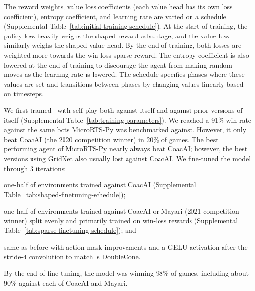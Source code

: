 \documentclass[conference]{IEEEtran}
\begin{document}
The reward weights, value loss coefficients (each value
head has its own loss coefficient), entropy coefficient, and learning rate are varied on
a schedule (Supplemental Table~\ref{tab:initial-training-schedule}). At the start of training, the policy loss heavily weighs the shaped 
reward advantage, and the value loss similarly weighs the shaped value head. By the end
of training, both losses are weighted more towards the win-loss sparse reward. The entropy coefficient is also
lowered at the end of training to discourage the agent from making random moves as the
learning rate is lowered. The schedule specifies phases where these values are set and
transitions between phases by changing values linearly based on timesteps.

We first trained \agentName\ with self-play both against itself and against prior
versions of itself (Supplemental Table~\ref{tab:training-parameters}). We reached a 91\% win rate against the same bots MicroRTS-Py was
benchmarked against. However, it only beat CoacAI (the 2020 competition winner) in 20\%
of games. The best performing agent of MicroRTS-Py nearly always beat CoacAI; however,
the best versions using GridNet also usually lost against CoacAI. We fine-tuned
the model through 3 iterations:
\begin{inparaenum}[(1)]
    \item one-half of environments trained against CoacAI (Supplemental Table~\ref{tab:shaped-finetuning-schedule});
    \item one-half of environments trained against CoacAI or Mayari (2021 competition
    winner) split evenly and primarily trained on win-loss rewards (Supplemental Table~\ref{tab:sparse-finetuning-schedule}); and
    \item same as before with action mask improvements and a GELU activation
    after the stride-4 convolution to match \cite{Ferdinand2021doublecone}'s DoubleCone.
\end{inparaenum}
By the end of fine-tuning, the model was winning 98\% of games, including about 90\%
against each of CoacAI and Mayari.
\end{document}
